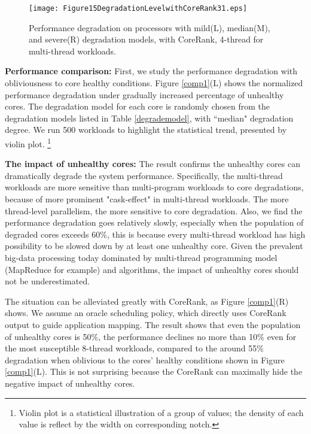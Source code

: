 \begin{figure*}[t]
 \centering
  \texttt{[image: Figure15DegradationLevelwithCoreRank31.eps]}\\
\caption{Performance degradation on processors with mild(L), median(M), and severe(R) degradation models,  with CoreRank,  4-thread for multi-thread workloads.}
\label{comp3}
\end{figure*}

\textbf{Performance comparison:} First, we study the performance degradation with obliviousness to core healthy conditions.  Figure \ref{comp1}(L) shows the normalized performance degradation under gradually increased percentage of unhealthy cores.   The degradation model for each core is randomly chosen from the degradation models listed in Table \ref{degrademodel}, with ``median" degradation degree.  We run 500 workloads to highlight the statistical trend, presented by violin plot. \footnote{Violin plot is a statistical illustration of a group of values; the density of each value is reflect by the width on corresponding notch.}  

\textbf{The impact of unhealthy cores:} The result confirms the unhealthy cores can dramatically degrade the system performance.  Specifically, the multi-thread workloads are more sensitive than multi-program workloads to core degradations, because of  more prominent "cask-effect" in multi-thread workloads. The more thread-level parallelism, the more sensitive to core degradation. Also, we find the performance degradation goes relatively slowly, especially when the population of degraded cores exceeds 60\%, this is because  every multi-thread workload has  high possibility to be slowed down by at least one unhealthy core. Given the prevalent big-data processing today dominated by multi-thread programming model (MapReduce for example) and algorithms, the impact of unhealthy cores should not be underestimated.

The situation can be alleviated greatly with CoreRank, as Figure \ref{comp1}(R) shows. We assume an oracle scheduling policy, which directly uses CoreRank output to guide application mapping. The result shows that even the population of unhealthy cores is 50\%, the performance declines no more than 10\% even for the most susceptible 8-thread workloads, compared to the around 55\% degradation when oblivious to the cores' healthy conditions shown in Figure \ref{comp1}(L).  This is not surprising because the CoreRank can maximally hide the negative impact of unhealthy cores.

